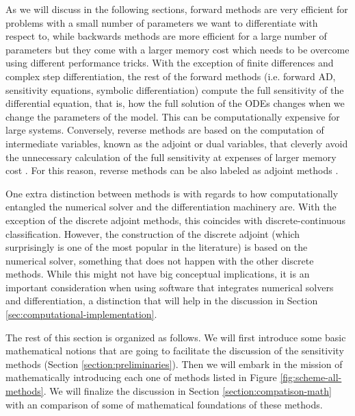 As we will discuss in the following sections, forward methods are very efficient for problems with a small number of parameters we want to differentiate with respect to, while backwards methods are more efficient for a large number of parameters but they come with a larger memory cost which needs to be overcome using different performance tricks. 
With the exception of finite differences and complex step differentiation, the rest of the forward methods (i.e. forward AD, sensitivity equations, symbolic differentiation) compute the full sensitivity of the differential equation, that is, how the full solution of the ODEs changes when we change the parameters of the model. 
This can be computationally expensive for large systems. 
Conversely, reverse methods are based on the computation of intermediate variables, known as the adjoint or dual variables, that cleverly avoid the unnecessary calculation of the full sensitivity at expenses of larger memory cost \cite{Givoli_2021}. 
For this reason, reverse methods can be also labeled as adjoint methods \cite{ma2021comparison}. 

One extra distinction between methods is with regards to how computationally entangled the numerical solver and the differentiation machinery are. 
With the exception of the discrete adjoint methods, this coincides with discrete-continuous classification. 
However, the construction of the discrete adjoint (which surprisingly is one of the most popular in the literature) is based on the numerical solver, something that does not happen with the other discrete methods. 
While this might not have big conceptual implications, it is an important consideration when using software that integrates numerical solvers and differentiation, a distinction that will help in the discussion in Section \ref{sec:computational-implementation}.


The rest of this section is organized as follows. 
We will first introduce some basic mathematical notions that are going to facilitate the discussion of the sensitivity methods (Section \ref{section:preliminaries}).
Then we will embark in the mission of mathematically introducing each one of methods listed in Figure \ref{fig:scheme-all-methods}.
We will finalize the discussion in Section \ref{section:compatison-math} with an comparison of some of mathematical foundations of these methods. 

